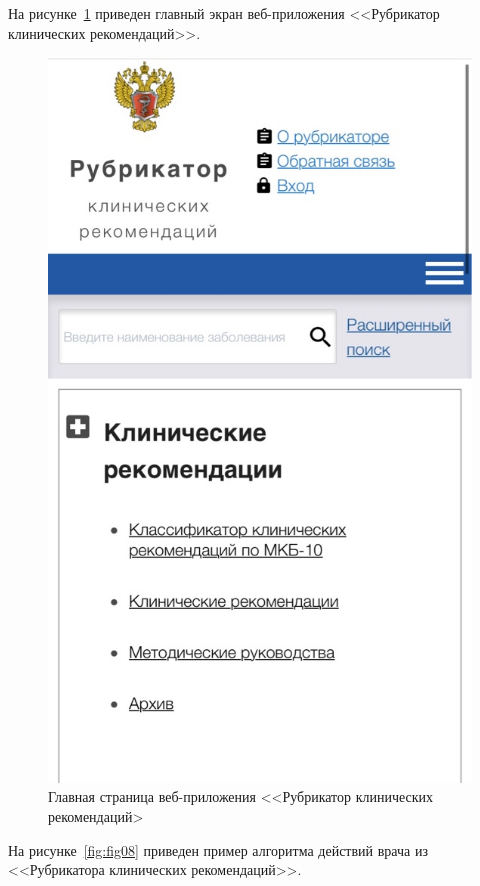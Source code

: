 \begin{enumerate}
    На рисунке~\ref{fig:fig07} приведен главный экран веб-приложения <<Рубрикатор клинических рекомендаций>>.
        \begin{figure}
        \includegraphics[scale=0.6]{styles/diploma/inc/prog3_1.jpeg}
        \caption{Главная страница веб-приложения <<Рубрикатор клинических рекомендаций>}
        \label{fig:fig07}
    \end{figure}
    
    На рисунке~\ref{fig:fig08} приведен пример алгоритма действий врача из <<Рубрикатора клинических рекомендаций>>.


\end{enumerate}
